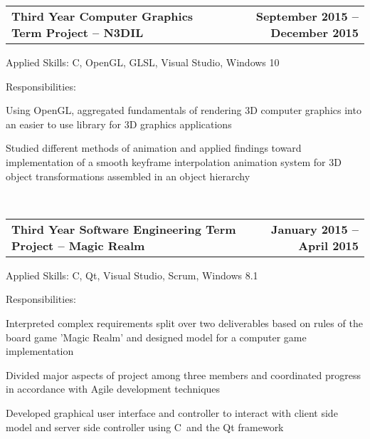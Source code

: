 \documentclass[10pt,letterpaper]{article}
\makeatletter
\newenvironment{indentsection}[1]%
{\begin{list}{}%
  {\setlength{\leftmargin}{#1}}%
  \item[]%
}
{\end{list}}
\newcommand{\headerrow}[2]
{\begin{tabular*}{\linewidth}{l@{\extracolsep{\fill}}r}
  #1 &
  #2 \\
\end{tabular*}}
\newcommand{\CPP}
{C\nolinebreak[4]\hspace{-.05em}\raisebox{.22ex}{\footnotesize\bf ++}}
\makeatother
\begin{document}
\begin{itemize}
  \item
  \headerrow
    {\textbf{Third Year Computer Graphics Term Project -- N3DIL}}
    {\textbf{September 2015 -- December 2015}}
  \begin{indentsection}{1em}
    \begin{description*}
      \item[Applied Skills:]
      \CPP, OpenGL, GLSL, Visual Studio, Windows 10
      \item[Responsibilities:]
      \hfill
      \begin{itemize*}
        \item Using OpenGL, aggregated fundamentals of rendering 3D computer
        graphics into an easier to use library for 3D graphics applications
        \item Studied different methods of animation and applied findings toward
        implementation of a smooth keyframe interpolation animation system for 3D
        object transformations assembled in an object hierarchy
      \end{itemize*}
    \end{description*}
  \end{indentsection}

  \ %

  \item
  \headerrow
    {\textbf{Third Year Software Engineering Term Project -- Magic Realm}}
    {\textbf{January 2015 -- April 2015}}
  \begin{indentsection}{1em}
    \begin{description*}
      \item[Applied Skills:]
      \CPP, Qt, Visual Studio, Scrum, Windows 8.1
      \item[Responsibilities:]
      \hfill
      \begin{itemize*}
        \item Interpreted complex requirements split over two deliverables based
        on rules of the board game 'Magic Realm' and designed model for a computer
        game implementation
        \item Divided major aspects of project among three members and coordinated
        progress in accordance with Agile development techniques
        \item Developed graphical user interface and controller to interact with
        client side model and server side controller using \CPP\ and the Qt
        framework
      \end{itemize*}
    \end{description*}
  \end{indentsection}


\end{itemize}
\end{document}
